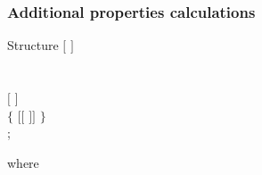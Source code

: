 \subsubsection{Additional properties calculations}\label{sect:descnap1}

\begin{DataStructure}{Structure }
$[$   $]$ \\
\\
   \\
$[$   $]$ \\
$\{$ $[[$    $]]$ $\}$ \\
;
\end{DataStructure}

\noindent where

